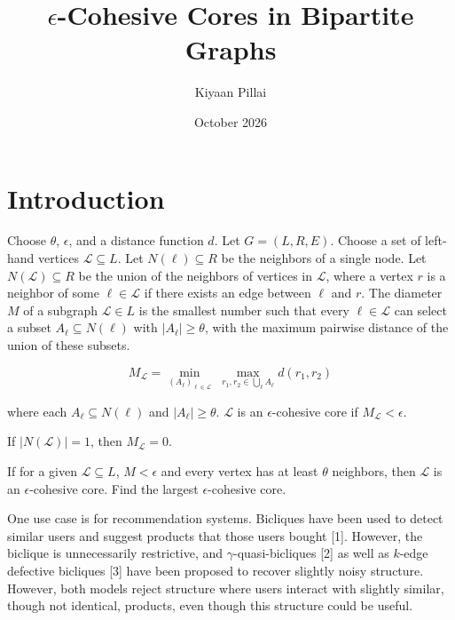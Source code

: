 \documentclass{article}
\title{$\epsilon$-Cohesive Cores in Bipartite Graphs}
\author{Kiyaan Pillai}
\date{October 2026}
\begin{document}
\maketitle

\section{Introduction}

Choose $\theta$, $\epsilon$, and a distance function $d$. Let $G = (L, R, E)$. Choose a set of left-hand vertices $\mathcal{L} \subseteq L$. Let $N(\ell) \subseteq R$ be the neighbors of a single node. Let $N(\mathcal{L}) \subseteq R$ be the union of the neighbors of vertices in $\mathcal{L}$, where a vertex $r$ is a neighbor of some $\ell \in \mathcal{L}$ if there exists an edge between $\ell$ and $r$. The diameter $M$ of a subgraph $\mathcal{L} \in L$ is the smallest number such that every $\ell \in \mathcal{L}$ can select a subset $A_\ell \subseteq N(\ell)$ with
$|A_\ell| \ge \theta$, with the maximum pairwise distance of the union of these subsets.

$$M_\mathcal{L} = \min_{(A_\ell)_{\ell\in\mathcal{L}}} \; \max_{r_1,r_2 \in \bigcup_\ell A_\ell} d(r_1,r_2)$$

where each $A_\ell \subseteq N(\ell)$ and $|A_\ell|\ge\theta$. $\mathcal{L}$ is an $\epsilon$-cohesive core if $M_\mathcal{L} < \epsilon$.

If $|N(\mathcal{L})| = 1$, then $M_\mathcal{L} = 0$.

If for a given $\mathcal{L} \subseteq L$, $M < \epsilon$ and every vertex has at least $\theta$ neighbors, then $\mathcal{L}$ is an $\epsilon$-cohesive core. Find the largest $\epsilon$-cohesive core.

One use case is for recommendation systems. Bicliques have been used to detect similar users and suggest products that those users bought [1]. However, the biclique is unnecessarily restrictive, and $\gamma$-quasi-bicliques [2] as well as $k$-edge defective bicliques [3] have been proposed to recover slightly noisy structure. However, both models reject structure where users interact with slightly similar, though not identical, products, even though this structure could be useful.
\end{document}
